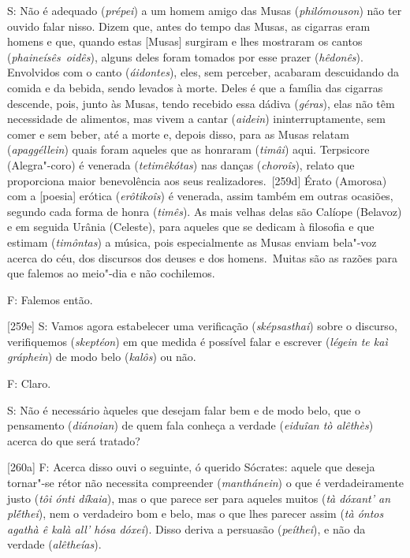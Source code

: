 S: Não é adequado (\emph{prépei}) a um homem amigo das Musas
(\emph{philómouson}) não ter ouvido falar nisso. Dizem que, antes do
tempo das Musas, as cigarras eram homens e que, quando estas [Musas]
surgiram e lhes mostraram os cantos (\emph{phaineísês}~\emph{oidês}),
alguns deles foram tomados por esse prazer (\emph{hêdonês}). Envolvidos
com o canto (\emph{áidontes}), eles, sem perceber, acabaram descuidando
da comida e da bebida, sendo levados à morte. Deles é que a família das
cigarras descende, pois, junto às Musas, tendo recebido essa dádiva
(\emph{géras}), elas não têm necessidade de alimentos, mas vivem a
cantar (\emph{aidein}) ininterruptamente, sem comer e sem beber, até a
morte e, depois disso, para as Musas relatam (\emph{apaggéllein}) quais
foram aqueles que as honraram (\emph{timâi}) aqui. Terpsicore
(Alegra"-coro) é venerada (\emph{tetimêkótas}) nas danças
(\emph{choroîs}), relato que proporciona maior benevolência aos seus
realizadores.~[259d] Érato (Amorosa) com a [poesia] erótica
(\emph{erôtikoîs}) é venerada, assim também em outras ocasiões, segundo
cada forma de honra (\emph{timês}). As mais velhas delas são Calíope
(Belavoz) e em seguida Urânia (Celeste), para aqueles que se dedicam à
filosofia e que estimam (\emph{timôntas}) a música, pois especialmente
as Musas enviam bela"-voz acerca do céu, dos discursos dos deuses e dos
homens.~Muitas são as razões para que falemos ao meio"-dia e não
cochilemos.

 

F: Falemos então.

 

[259e] S: Vamos agora estabelecer uma verificação
(\emph{sképsasthai}) sobre o discurso, verifiquemos (\emph{skeptéon}) em
que medida é possível falar e escrever (\emph{légein te kaì gráphein})
de modo belo (\emph{kalôs}) ou não.

 

F: Claro.

 

S: Não é necessário àqueles que desejam falar bem e de modo belo, que o
pensamento (\emph{diánoian}) de quem fala conheça a verdade
(\emph{eiduîan tò alêthès}) acerca do que será tratado?

 

[260a] F: Acerca disso ouvi o seguinte, ó querido Sócrates: aquele
que deseja tornar"-se rétor não necessita compreender (\emph{manthánein})
o que é verdadeiramente justo (\emph{tôi ónti díkaia}), mas o que parece
ser para aqueles muitos (\emph{tà dóxant' an plḗthei}), nem o verdadeiro
bom e belo, mas o que lhes parecer assim (\emph{tà óntos agathà ê kalà
all' hósa dóxei}). Disso deriva a persuasão (\emph{peíthei}), e não da
verdade (\emph{alêtheías}).

